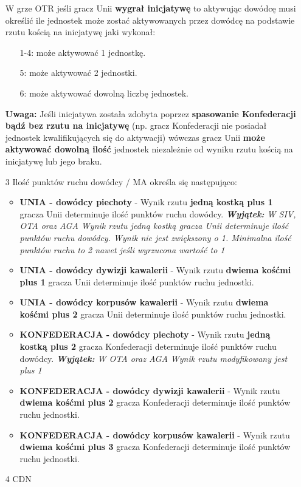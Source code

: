 \begin{itemize}
{        W grze OTR jeśli gracz Unii \textbf{wygrał inicjatywę} to aktywując dowódcę musi określić ile jednostek może zostać aktywowanych przez dowódcę na podstawie rzutu kością na inicjatywę jaki wykonał:
        \begin{itemize}
          \item[1-4:] może aktywować 1 jednostkę.
          \item[  5:] może aktywować 2 jednostki.
          \item[  6:] może aktywować dowolną liczbę jednostek.
        \end{itemize}
        \textbf{Uwaga:} Jeśli inicjatywa została zdobyta poprzez \textbf{spasowanie Konfederacji bądź bez rzutu na inicjatywę} (np. gracz Konfederacji nie posiadał jednostek kwalifikujących się do aktywacji) wówczas gracz Unii \textbf{może aktywować dowolną ilość} jednostek niezależnie od wyniku rzutu kością na inicjatywę lub jego braku.}
  \item[3] Ilość punktów ruchu dowódcy / MA określa się następująco:
        \begin{itemize}
          \item \textbf{UNIA - dowódcy piechoty} - Wynik rzutu \textbf{jedną kostką plus 1} gracza Unii determinuje ilość punktów ruchu dowódcy.
                \textit{\textbf{Wyjątek:} W SIV, OTA oraz AGA Wynik rzutu jedną kostką gracza Unii determinuje ilość punktów ruchu dowódcy. Wynik nie jest zwiększony o 1. Minimalna ilość punktów ruchu to 2 nawet jeśli wyrzucona wartość to 1}
          \item \textbf{UNIA - dowódcy dywizji kawalerii} - Wynik rzutu \textbf{dwiema kośćmi plus 1} gracza Unii determinuje ilość punktów ruchu jednostki.
          \item \textbf{UNIA - dowódcy korpusów kawalerii} - Wynik rzutu \textbf{dwiema kośćmi plus 2} gracza Unii determinuje ilość punktów ruchu jednostki.
          \item \textbf{KONFEDERACJA - dowódcy piechoty} - Wynik rzutu \textbf{jedną kostką plus 2} gracza Konfederacji determinuje ilość punktów ruchu dowódcy.
                \textit{\textbf{Wyjątek:} W OTA oraz AGA Wynik rzutu modyfikowany jest plus 1}
          \item \textbf{KONFEDERACJA - dowódcy dywizji kawalerii} - Wynik rzutu \textbf{dwiema kośćmi plus 2} gracza Konfederacji determinuje ilość punktów ruchu jednostki.
          \item \textbf{KONFEDERACJA - dowódcy korpusów kawalerii} - Wynik rzutu \textbf{dwiema kośćmi plus 3} gracza Konfederacji determinuje ilość punktów ruchu jednostki.
        \end{itemize}
  \item[4] CDN
\end{itemize}